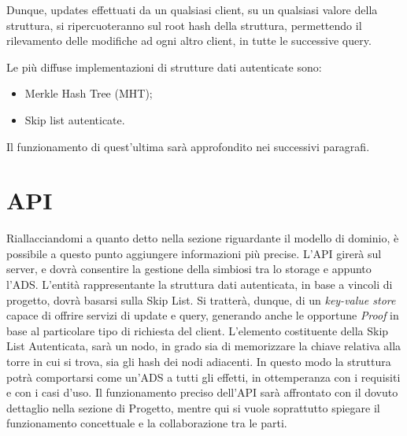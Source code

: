 		Dunque, updates effettuati da un qualsiasi client, su un qualsiasi valore della struttura, si ripercuoteranno sul root hash della struttura, permettendo il rilevamento delle modifiche ad ogni altro client, in tutte le successive query.
		
		Le più diffuse implementazioni di strutture dati autenticate sono:
		
		\begin{itemize}
			\item Merkle Hash Tree (MHT);
			\item Skip list autenticate.
		\end{itemize}
	
		Il funzionamento di quest'ultima sarà approfondito nei successivi paragrafi.
	
\section{API}

%	

	Riallacciandomi a quanto detto nella sezione riguardante il modello di dominio, è possibile a questo punto aggiungere informazioni più precise. L'API girerà sul server, e dovrà consentire la gestione della simbiosi tra lo storage e appunto l'ADS. L'entità rappresentante la struttura dati autenticata, in base a vincoli di progetto, dovrà basarsi sulla Skip List. Si tratterà, dunque, di un \textit{key-value store} capace di offrire servizi di update e query, generando anche le opportune \textit{Proof} in base al particolare tipo di richiesta del client. L'elemento costituente della Skip List Autenticata, sarà un nodo, in grado sia di memorizzare la chiave relativa alla torre in cui si trova, sia gli hash dei nodi adiacenti. In questo modo la struttura potrà comportarsi come un'ADS a tutti gli effetti, in ottemperanza con i requisiti e con i casi d'uso. Il funzionamento preciso dell'API sarà affrontato con il dovuto dettaglio nella sezione di Progetto, mentre qui si vuole soprattutto spiegare il funzionamento concettuale e la collaborazione tra le parti.
	

